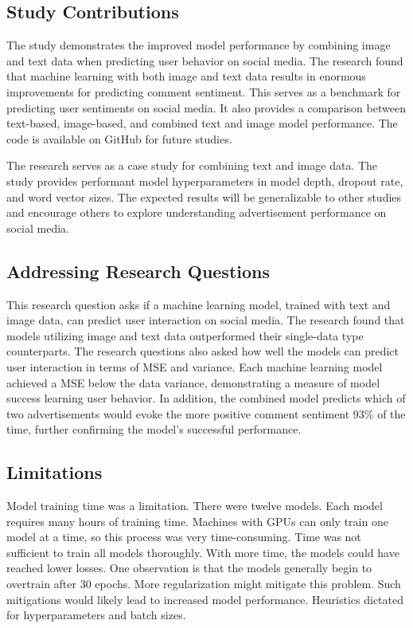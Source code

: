 \documentclass{article}
\begin{document}
\subsection{Study Contributions}
The study demonstrates the improved model performance by combining image and text data when predicting user behavior on social media.  The research found that machine learning with both image and text data results in enormous improvements for predicting comment sentiment.  This serves as a benchmark for predicting user sentiments on social media.  It also provides a comparison between text-based, image-based, and combined text and image model performance. The code is available on GitHub for future studies.

The research serves as a case study for combining text and image data. The study provides performant model hyperparameters in model depth, dropout rate, and word vector sizes.  The expected results will be generalizable to other studies and encourage others to explore understanding advertisement performance on social media.

\subsection{Addressing Research Questions}
This research question asks if a machine learning model, trained with text and image data, can predict user interaction on social media.  The research found that models utilizing image and text data outperformed their single-data type counterparts.  The research questions also asked how well the models can predict user interaction in terms of MSE and variance.  Each machine learning model achieved a MSE below the data variance, demonstrating a measure of model success learning user behavior. In addition, the combined model predicts which of two advertisements would evoke the more positive comment sentiment 93\% of the time, further confirming the model's successful performance.

\subsection{Limitations}
Model training time was a limitation. There were twelve models. Each model requires many hours of training time. Machines with GPUs can only train one model at a time, so this process was very time-consuming. Time was not sufficient to train all models thoroughly. With more time, the models could have reached lower losses.  One observation is that the models generally begin to overtrain after 30 epochs. More regularization might mitigate this problem. Such mitigations would likely lead to increased model performance. Heuristics dictated for hyperparameters and batch sizes. 
\end{document}
